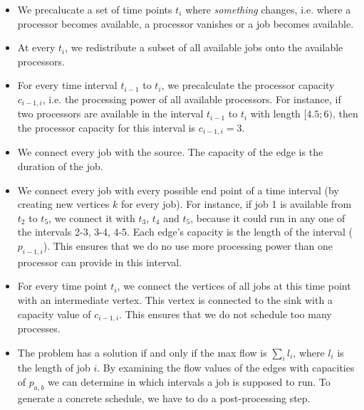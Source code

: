 \documentclass[12pt]{article}
\begin{document}
\begin{itemize}
	\item We precalucate a set of time points $t_i$ where \emph{something} changes, i.e. where a processor becomes available, a processor vanishes or a job becomes available.
	\item At every $t_i$, we redistribute a subset of all available jobs onto the available processors.
	\item For every time interval $t_{i-1}$ to $t_i$, we precalculate the processor capacity $c_{i-1, i}$, i.e. the processing power of all available processors. For instance, if two processors are available in the interval $t_{i-1}$ to $t_i$ with length $[4.5; 6)$, then the processor capacity for this interval is $c_{i-1, i} = 3$.
	\item We connect every job with the source. The capacity of the edge is the duration of the job.
	\item We connect every job with every possible end point of a time interval (by creating new vertices $k$ for every job). For instance, if job 1 is available from $t_2$ to $t_5$, we connect it with $t_3$, $t_4$ and $t_5$, because it could run in any one of the intervals 2-3, 3-4, 4-5. Each edge's capacity is the length of the interval ($p_{i-1,i}$). This ensures that we do no use more processing power than one processor can provide in this interval.
	\item For every time point $t_i$, we connect the vertices of all jobs at this time point with an intermediate vertex. This vertex is connected to the sink with a capacity value of $c_{i-1, i}$. This ensures that we do not schedule too many processes.
	\item The problem has a solution if and only if the max flow is $\sum_i l_i$, where $l_i$ is the length of job $i$. By examining the flow values of the edges with capacities of $p_{a,b}$ we can determine in which intervals a job is supposed to run. To generate a concrete schedule, we have to do a post-processing step.
\end{itemize}
\end{document}
